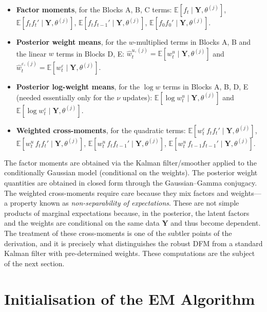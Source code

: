 \documentclass[11pt, a4paper, oneside]{article}
\newcommand{\mY}{\mathbf{Y}}
\begin{document}
\begin{itemize}[leftmargin=1.5em, itemsep=3pt]
    \item \textbf{Factor moments}, for the Blocks A, B, C terms:
          $\mathbb{E}[f_t \mid \mY, \theta^{(j)}]$,
          $\mathbb{E}[f_t f_t' \mid \mY, \theta^{(j)}]$,
          $\mathbb{E}[f_t f_{t-1}' \mid \mY, \theta^{(j)}]$,
          $\mathbb{E}[f_0 f_0' \mid \mY, \theta^{(j)}]$.
    \item \textbf{Posterior weight means}, for the $w$-multiplied
          terms in Blocks A, B and the linear $w$ terms in Blocks D, E:
          $\hat{w}^{u,(j)}_t = \mathbb{E}[w^u_t \mid \mY, \theta^{(j)}]$ and
          $\hat{w}^{\varepsilon,(j)}_t = \mathbb{E}[w^\varepsilon_t \mid \mY, \theta^{(j)}]$.
    \item \textbf{Posterior log-weight means}, for the $\log w$ terms in
          Blocks A, B, D, E (needed essentially only for the $\nu$ updates):
          $\mathbb{E}[\log w^u_t \mid \mY, \theta^{(j)}]$ and
          $\mathbb{E}[\log w^\varepsilon_t \mid \mY, \theta^{(j)}]$.
    \item \textbf{Weighted cross-moments}, for the quadratic terms:
          $\mathbb{E}[w^\varepsilon_t\, f_t f_t' \mid \mY, \theta^{(j)}]$,
          $\mathbb{E}[w^u_t\, f_t f_t' \mid \mY, \theta^{(j)}]$,
          $\mathbb{E}[w^u_t\, f_t f_{t-1}' \mid \mY, \theta^{(j)}]$,
          $\mathbb{E}[w^u_t\, f_{t-1} f_{t-1}' \mid \mY, \theta^{(j)}]$.
\end{itemize}
The factor moments are obtained via the Kalman filter/smoother applied
to the conditionally Gaussian model (conditional on the weights). The
posterior weight quantities are obtained in closed form through the
Gaussian–Gamma conjugacy. The weighted cross-moments require care because they mix factors and 
weights—a property known as \emph{non-separability of expectations}. 
These are not simple products of marginal expectations because, in 
the posterior, the latent factors and the weights are conditional on 
the same data $\mY$ and thus become dependent. The treatment of 
these cross-moments is one of the subtler points of the derivation, 
and it is precisely what distinguishes the robust DFM from a 
standard Kalman filter with pre-determined weights.
These computations are the subject of the next section.
\newpage

\section{Initialisation of the EM Algorithm}
\label{sec:initialisation}
\end{document}
